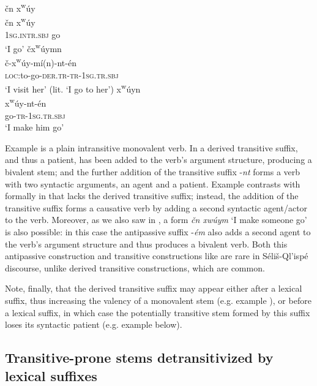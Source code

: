 \documentclass[output=paper,colorlinks,citecolor=brown]{langscibook}
\begin{document}
\ea 
\label{ex-thomason-35}
\v{c}n x\textsuperscript w\'uy \\
\gll \v{c}n x\textsuperscript w\'uy \\
\textsc{1sg}.\textsc{intr.sbj} go \\
\glt `I go'
\ex 
\label{ex-thomason-36}
\v{c}x\textsuperscript w\'uymn \\
\gll \v{c}-x\textsuperscript w\'uy-m\'i(n)-nt-\'en \\
\textsc{loc:}to-go-\textsc{der.tr-tr}-\textsc{1sg}.\textsc{tr.sbj} \\
\glt `I visit her' (lit. `I go to her')
\ex 
\label{ex-thomason-37}
x\textsuperscript w\'uyn \\
\gll x\textsuperscript w\'uy-nt-\'en \\
go-\textsc{tr}-\textsc{1sg}.\textsc{tr.sbj} \\
\glt `I make him go'
\z

Example  is a plain intransitive monovalent verb. In  a derived
transitive suffix, and thus a patient, has been added to the verb's
argument structure, producing a bivalent stem; and the further
addition of the transitive suffix -\emph{nt} forms a verb with two
syntactic arguments, an agent and a patient.  Example  contrasts with 
formally in that  lacks the derived transitive suffix; instead, the
addition of the transitive suffix forms a causative verb by adding a
second syntactic agent/actor to the verb.  Moreover, as we also saw in
, a form \emph{\v{c}n xw\'uym} `I make someone go' is also
possible: in this case the antipassive suffix -\emph{\'em} also adds a
second agent to the verb's argument structure and thus produces a
bivalent verb.  Both this antipassive construction and transitive
constructions like  are rare in S\'eli\v{s}-Ql'isp\'e discourse,
unlike derived transitive constructions, which are common.

Note, finally, that the derived transitive suffix may appear either
after a lexical suffix, thus increasing the valency of a monovalent
stem (e.g. example ), or before a lexical suffix, in which case the
potentially transitive stem formed by this suffix loses its syntactic
patient (e.g. example  below).

\subsection{Transitive-prone stems detransitivized by lexical suffixes}  %
\label{thomason_section_2.8}
\end{document}
